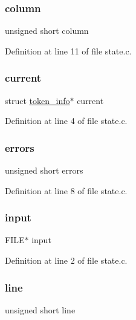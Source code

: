 \subsubsection{\texorpdfstring{column}{column}}
{\footnotesize\ttfamily unsigned short column}



Definition at line 11 of file state.\+c.

\mbox{\label{structstate_a825c85b4ca3062c1b9eddfb7c7db51e8}} 
\subsubsection{\texorpdfstring{current}{current}}
{\footnotesize\ttfamily struct \mbox{\hyperlink{structtoken__info}{token\+\_\+info}}$\ast$ current}



Definition at line 4 of file state.\+c.

\mbox{\label{structstate_a2ff1e8f5aaf49121a59c84adb687936c}} 
\subsubsection{\texorpdfstring{errors}{errors}}
{\footnotesize\ttfamily unsigned short errors}



Definition at line 8 of file state.\+c.

\mbox{\label{structstate_abfae665d56d61e1c21831bec369abd34}} 
\subsubsection{\texorpdfstring{input}{input}}
{\footnotesize\ttfamily F\+I\+LE$\ast$ input}



Definition at line 2 of file state.\+c.

\mbox{\label{structstate_a12da61ba70beb7fda26fb3c1703b7b12}} 
\subsubsection{\texorpdfstring{line}{line}}
{\footnotesize\ttfamily unsigned short line}



